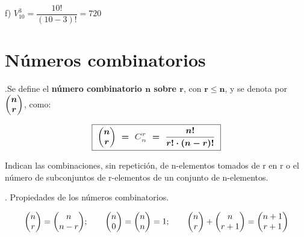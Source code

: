 	\hspace{2cm} f) $V_{10}^3=\dfrac{10!}{(10-3)!}=720$ 	
	


\vspace{0.5cm} %
\section{Números combinatorios}\label{tartaglia}

\begin{definition}
	.Se define el \textbf{número combinatorio $\boldsymbol{n}$ sobre $\boldsymbol{r}$}, con $\boldsymbol{r\le n}$, y se denota por $\boldsymbol{\mqty(n\\r)}$, como:
	
	\vspace{2mm} $$\boxed{\ \boldsymbol{ \mqty(n\\r) \ = \ \textcolor{gris}{C_n^r} \ = \ \dfrac {n!}{r! \cdot (n-r)!} }	 \ }$$
	
	\vspace{2mm} Indican las combinaciones, sin repetición, de n-elementos tomados de r en r o el número de subconjuntos de r-elementos de un conjunto de n-elementos.
\end{definition}

\begin{theorem}
	. Propiedades de los números combinatorios.
	
	\begin{small}
	$$\mqty(n\\r)=\mqty(n\\n-r); \qquad \mqty(n\\0)=\mqty(n\\n)=1; \qquad \mqty(n\\r)+\mqty(n\\r+1)=\mqty(n+1\\r+1)$$
	\end{small}	
\end{theorem}


